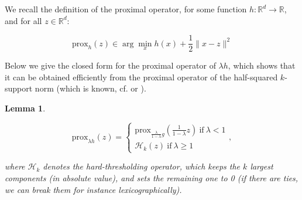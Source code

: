 \documentclass{article}
\newtheorem{lemma}{Lemma}
\begin{document}
We recall the definition of the proximal operator, for some function $h: \mathbb{R}^d \rightarrow \mathbb{R}$, and for all $z \in \mathbb{R}^d$: 

$$\text{prox}_{h}(z) \in \arg\min_{x} h(x) + \frac{1}{2} \| x - z\|^2 $$







Below we give the closed form for the proximal operator of $\lambda h$, which shows that it can be obtained efficiently from the proximal operator of the half-squared $k$-support norm (which is known, cf. \cite{argyriou2012sparse} or \cite{mcdonald2016new}).

\begin{lemma}\label{lem:proximal_closed_form}
    
$$\text{prox}_{\lambda h} (z) = \begin{cases}
    \text{prox}_{\frac{\lambda}{1 - \lambda} g}(\frac{1}{1 - \lambda}z) ~\text{if}~ \lambda < 1\\
    \mathcal{H}_k(z) ~\text{if}~ \lambda \geq 1
\end{cases}, $$




where $ \mathcal{H}_k$ denotes the hard-thresholding operator, which keeps the $k$ largest components (in absolute value), and sets the remaining one to 0 (if there are ties, we can break them for instance lexicographically).
\end{lemma}
\end{document}
